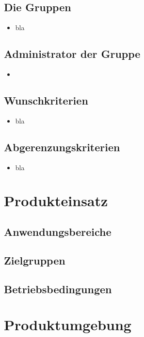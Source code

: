 \documentclass[parskip=full,11pt]{scrartcl}
\begin{document}
\subsection*{Die Gruppen}
\begin{itemize}[itemsep=0pt]
 \item bla
\end{itemize}

\subsection*{Administrator der Gruppe}
\begin{itemize}[itemsep=0pt]
 \item 
\end{itemize}




\subsection{Wunschkriterien}
\begin{itemize}[itemsep=0pt]
\item bla
\end{itemize}
\subsection{Abgerenzungskriterien}
\begin{itemize}[itemsep=0pt]
\item bla
\end{itemize}


\section{Produkteinsatz}

\subsection{Anwendungsbereiche}
\subsection{Zielgruppen}
\subsection{Betriebsbedingungen}


\section{Produktumgebung}
\end{document}
